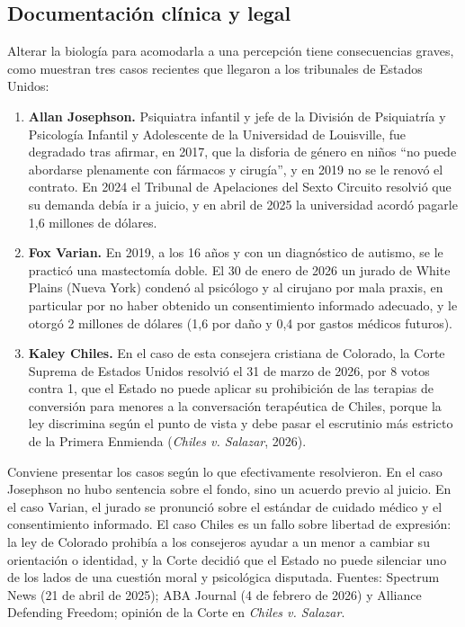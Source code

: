 \documentclass[11pt,letterpaper]{article}
\begin{document}
\subsection{Documentación clínica y legal}
Alterar la biología para acomodarla a una percepción tiene consecuencias graves, como muestran tres casos recientes que llegaron a los tribunales de Estados Unidos:

\begin{enumerate}
\item \textbf{Allan Josephson.} Psiquiatra infantil y jefe de la División de Psiquiatría y Psicología Infantil y Adolescente de la Universidad de Louisville, fue degradado tras afirmar, en 2017, que la disforia de género en niños ``no puede abordarse plenamente con fármacos y cirugía'', y en 2019 no se le renovó el contrato. En 2024 el Tribunal de Apelaciones del Sexto Circuito resolvió que su demanda debía ir a juicio, y en abril de 2025 la universidad acordó pagarle 1,6 millones de dólares.
\item \textbf{Fox Varian.} En 2019, a los 16 años y con un diagnóstico de autismo, se le practicó una mastectomía doble. El 30 de enero de 2026 un jurado de White Plains (Nueva York) condenó al psicólogo y al cirujano por mala praxis, en particular por no haber obtenido un consentimiento informado adecuado, y le otorgó 2 millones de dólares (1,6 por daño y 0,4 por gastos médicos futuros).
\item \textbf{Kaley Chiles.} En el caso de esta consejera cristiana de Colorado, la Corte Suprema de Estados Unidos resolvió el 31 de marzo de 2026, por 8 votos contra 1, que el Estado no puede aplicar su prohibición de las terapias de conversión para menores a la conversación terapéutica de Chiles, porque la ley discrimina según el punto de vista y debe pasar el escrutinio más estricto de la Primera Enmienda (\emph{Chiles v. Salazar}, 2026).
\end{enumerate}

\begin{nota}[Precisión]
Conviene presentar los casos según lo que efectivamente resolvieron. En el caso Josephson no hubo sentencia sobre el fondo, sino un acuerdo previo al juicio. En el caso Varian, el jurado se pronunció sobre el estándar de cuidado médico y el consentimiento informado. El caso Chiles es un fallo sobre libertad de expresión: la ley de Colorado prohibía a los consejeros ayudar a un menor a cambiar su orientación o identidad, y la Corte decidió que el Estado no puede silenciar uno de los lados de una cuestión moral y psicológica disputada. Fuentes: Spectrum News (21 de abril de 2025); ABA Journal (4 de febrero de 2026) y Alliance Defending Freedom; opinión de la Corte en \emph{Chiles v. Salazar}.
\end{nota}
\end{document}
